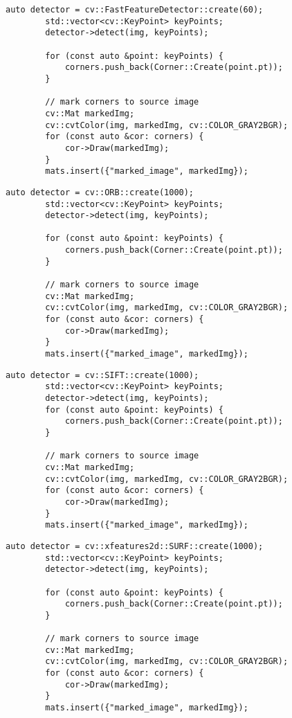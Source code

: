 \documentclass[12pt, onecolumn]{article}
\newcommand\normf{\fangsong}
\begin{document}
	\begin{lstlisting}[caption={\normf FAST角点检测代码}]
	    auto detector = cv::FastFeatureDetector::create(60);
	    std::vector<cv::KeyPoint> keyPoints;
	    detector->detect(img, keyPoints);
	
	    for (const auto &point: keyPoints) {
	        corners.push_back(Corner::Create(point.pt));
	    }
	
	    // mark corners to source image
	    cv::Mat markedImg;
	    cv::cvtColor(img, markedImg, cv::COLOR_GRAY2BGR);
	    for (const auto &cor: corners) {
	        cor->Draw(markedImg);
	    }
	    mats.insert({"marked_image", markedImg});
	\end{lstlisting}
	\begin{lstlisting}[caption={\normf ORB角点检测代码}]
	    auto detector = cv::ORB::create(1000);
	    std::vector<cv::KeyPoint> keyPoints;
	    detector->detect(img, keyPoints);
	
	    for (const auto &point: keyPoints) {
	        corners.push_back(Corner::Create(point.pt));
	    }
	
	    // mark corners to source image
	    cv::Mat markedImg;
	    cv::cvtColor(img, markedImg, cv::COLOR_GRAY2BGR);
	    for (const auto &cor: corners) {
	        cor->Draw(markedImg);
	    }
	    mats.insert({"marked_image", markedImg});
	\end{lstlisting}
	\begin{lstlisting}[caption={\normf SIFT角点检测代码}]
	    auto detector = cv::SIFT::create(1000);
	    std::vector<cv::KeyPoint> keyPoints;
	    detector->detect(img, keyPoints);
	    for (const auto &point: keyPoints) {
	        corners.push_back(Corner::Create(point.pt));
	    }
	
	    // mark corners to source image
	    cv::Mat markedImg;
	    cv::cvtColor(img, markedImg, cv::COLOR_GRAY2BGR);
	    for (const auto &cor: corners) {
	        cor->Draw(markedImg);
	    }
	    mats.insert({"marked_image", markedImg});
	\end{lstlisting}
	\begin{lstlisting}[caption={\normf SURF角点检测代码}]
	    auto detector = cv::xfeatures2d::SURF::create(1000);
	    std::vector<cv::KeyPoint> keyPoints;
	    detector->detect(img, keyPoints);
	
	    for (const auto &point: keyPoints) {
	        corners.push_back(Corner::Create(point.pt));
	    }
	
	    // mark corners to source image
	    cv::Mat markedImg;
	    cv::cvtColor(img, markedImg, cv::COLOR_GRAY2BGR);
	    for (const auto &cor: corners) {
	        cor->Draw(markedImg);
	    }
	    mats.insert({"marked_image", markedImg});
	\end{lstlisting}
\end{document}
